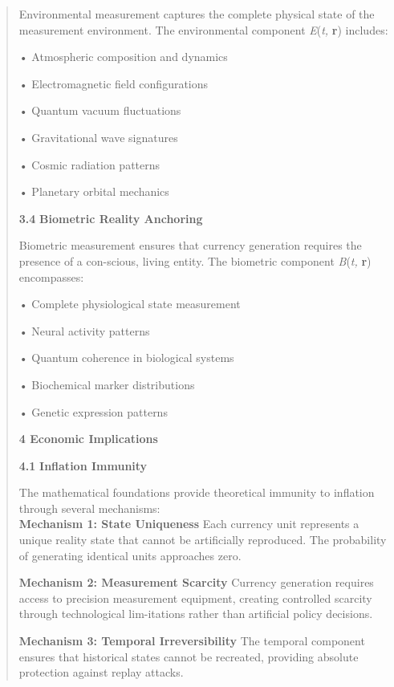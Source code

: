 \documentclass[
]{article}
\begin{document}
\begin{quote}
Environmental measurement captures the complete physical state of the
measurement environment. The environmental component \emph{E}(\emph{t,}
\textbf{r}) includes:

• Atmospheric composition and dynamics

• Electromagnetic field configurations

• Quantum vacuum fluctuations

• Gravitational wave signatures

• Cosmic radiation patterns

• Planetary orbital mechanics

\textbf{3.4} \textbf{Biometric Reality Anchoring}

Biometric measurement ensures that currency generation requires the
presence of a con-scious, living entity. The biometric component
\emph{B}(\emph{t,} \textbf{r}) encompasses:

• Complete physiological state measurement

• Neural activity patterns

• Quantum coherence in biological systems

• Biochemical marker distributions

• Genetic expression patterns

\textbf{4 Economic Implications}

\textbf{4.1} \textbf{Inflation Immunity}

The mathematical foundations provide theoretical immunity to inflation
through several mechanisms:\\
\textbf{Mechanism 1: State Uniqueness} Each currency unit represents a
unique reality state that cannot be artificially reproduced. The
probability of generating identical units approaches zero.

\textbf{Mechanism 2: Measurement Scarcity} Currency generation requires
access to precision measurement equipment, creating controlled scarcity
through technological lim-itations rather than artificial policy
decisions.

\textbf{Mechanism 3: Temporal Irreversibility} The temporal component
ensures that historical states cannot be recreated, providing absolute
protection against replay attacks.
\end{quote}
\end{document}
